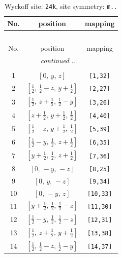 \documentclass[fleqn,8pt]{jsarticle}
\begin{document}
\begin{longtable}{ccc}
\caption{Wyckoff site: {\tt 24k}, site symmetry: {\tt m..}}
 \\
 \hline \hline
No. & position & mapping \\ \hline \endfirsthead

\multicolumn{2}{l}{\tablename\ \thetable{}} \\
 \hline \hline
No. & position & mapping \\ \hline \endhead

 \hline \hline
\multicolumn{2}{r}{\footnotesize\it continued ...} \\ \endfoot

 \hline \hline
\multicolumn{2}{r}{} \\ \endlastfoot

1 & $\left[ 0,\, y,\, z \right]$ & {\tt [1,32]} \\ \hline
2 & $\left[ \frac{1}{2},\, \frac{1}{2} - z,\, y + \frac{1}{2} \right]$ & {\tt [2,27]} \\ \hline
3 & $\left[ \frac{1}{2},\, z + \frac{1}{2},\, \frac{1}{2} - y \right]$ & {\tt [3,26]} \\ \hline
4 & $\left[ z + \frac{1}{2},\, y + \frac{1}{2},\, \frac{1}{2} \right]$ & {\tt [4,40]} \\ \hline
5 & $\left[ \frac{1}{2} - z,\, y + \frac{1}{2},\, \frac{1}{2} \right]$ & {\tt [5,39]} \\ \hline
6 & $\left[ \frac{1}{2} - y,\, \frac{1}{2},\, z + \frac{1}{2} \right]$ & {\tt [6,35]} \\ \hline
7 & $\left[ y + \frac{1}{2},\, \frac{1}{2},\, z + \frac{1}{2} \right]$ & {\tt [7,36]} \\ \hline
8 & $\left[ 0,\, - y,\, - z \right]$ & {\tt [8,25]} \\ \hline
9 & $\left[ 0,\, y,\, - z \right]$ & {\tt [9,34]} \\ \hline
10 & $\left[ 0,\, - y,\, z \right]$ & {\tt [10,33]} \\ \hline
11 & $\left[ y + \frac{1}{2},\, \frac{1}{2},\, \frac{1}{2} - z \right]$ & {\tt [11,30]} \\ \hline
12 & $\left[ \frac{1}{2} - y,\, \frac{1}{2},\, \frac{1}{2} - z \right]$ & {\tt [12,31]} \\ \hline
13 & $\left[ \frac{1}{2},\, z + \frac{1}{2},\, y + \frac{1}{2} \right]$ & {\tt [13,38]} \\ \hline
14 & $\left[ \frac{1}{2},\, \frac{1}{2} - z,\, \frac{1}{2} - y \right]$ & {\tt [14,37]} \\ \hline

\end{longtable}
\end{document}

